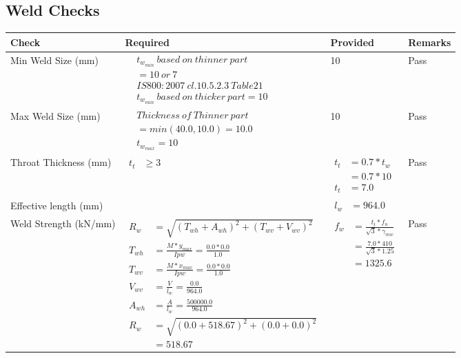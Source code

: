 \documentclass{article}%
\begin{document}
\subsection{Weld Checks}%
\label{subsec:WeldChecks}%
\renewcommand{\arraystretch}{1.2}%
\begin{longtable}{|p{3cm}|p{7cm}|p{5cm}|p{1cm}|}%
\hline%
\rowcolor{OsdagGreen}%
Check&Required&Provided&Remarks\\%
\hline%
\endhead%
\hline%
Min Weld Size (mm)&$\begin{aligned} & t_{w_{min}}~based~on~thinner~part\\ & =10~or~7\\ & IS800:2007~cl.10.5.2.3~Table 21\\ & t_{w_{min}}~based~on~thicker~part=10\end{aligned}$&10&Pass\\%
\hline%
Max Weld Size (mm)&$\begin{aligned} & Thickness~of~Thinner~part\\ &=min(40.0,10.0)=10.0\\ &t_{w_{max}} =10\end{aligned}$&10&Pass\\%
\hline%
Throat Thickness (mm)&$\begin{aligned} t_t &\geq 3 \end{aligned}$&$\begin{aligned} t_t & = 0.7* t_w \\ & = 0.7*10\\ t_t & = 7.0\end{aligned}$&Pass\\%
\hline%
Effective length (mm)&&$\begin{aligned} l_w &=964.0\end{aligned}$&\\%
\hline%
Weld Strength (kN/mm)&$\begin{aligned} R_w&=\sqrt{(T_{wh}+A_{wh})^2 + (T_{wv}+V_{wv})^2}\\ T_{wh}&=\frac{M*y_{max}}{I{pw}}=\frac{0.0*0.0}{1.0}\\ T_{wv}&=\frac{M*x_{max}}{I{pw}}=\frac{0.0*0.0}{1.0}\\ V_{wv}&=\frac{V}{l_w}=\frac{0.0}{964.0}\\ A_{wh}&=\frac{A}{l_w}=\frac{500000.0}{964.0}\\ R_w&=\sqrt{(0.0+518.67)^2 + (0.0+0.0)^2}\\ &=518.67\end{aligned}$&$\begin{aligned} f_w &=\frac{t_t*f_u}{\sqrt{3}*\gamma_{mw}}\\ &=\frac{7.0*410}{\sqrt{3}*1.25}\\ &=1325.6\end{aligned}$&Pass\\%
\hline%
\end{longtable}
\end{document}
